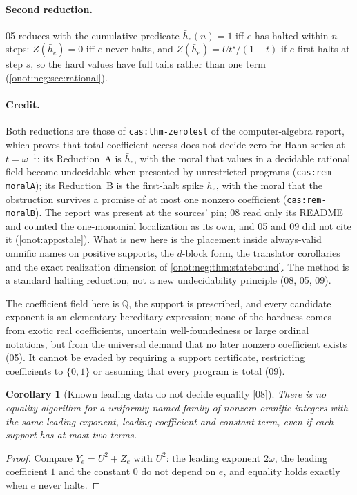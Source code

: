 \documentclass[11pt,oneside]{article}
\numberwithin{equation}{section}
\newtheorem{corollary}[corollary]{Corollary}
\theoremstyle{definition}
\theoremstyle{remark}
\newcommand{\Q}{\mathbb Q}
\newcommand{\hb}{\bar h}
\newcommand{\src}[1]{\textup{\textsf{\small[#1]}}}
\newcommand{\replabel}[1]{\nolinkurl{#1}}
\begin{document}
\paragraph{Second reduction.} 05 reduces with the cumulative predicate
$\hb_e(n)=1$ iff $e$ has halted within $n$ steps: $Z(\hb_e)=0$ iff $e$ never
halts, and $Z(\hb_e)=U t^s/(1-t)$ if $e$ first halts at step $s$, so the hard
values have full tails rather than one term (\cref{onot:neg:sec:rational}).

\paragraph{Credit.} Both reductions are those of \replabel{cas:thm-zerotest} of
the computer-algebra report, which proves that total coefficient access does not
decide zero for Hahn series at $t=\omega^{-1}$: its Reduction~A is $\hb_e$, with
the moral that values in a decidable rational field become undecidable when
presented by unrestricted programs (\replabel{cas:rem-moralA}); its Reduction~B is
the first-halt spike $h_e$, with the moral that the obstruction survives a promise
of at most one nonzero coefficient (\replabel{cas:rem-moralB}). The report was
present at the sources' pin; 08 read only its README and counted the
one-monomial localization as its own, and 05 and 09 did not cite it
(\cref{onot:app:stale}). What is new here is the placement inside always-valid
omnific names on positive supports, the $d$-block form, the translator
corollaries and the exact realization dimension of \cref{onot:neg:thm:statebound}.
The method is a standard halting reduction, not a new undecidability principle
(08, 05, 09).

The coefficient field here is $\Q$, the support is prescribed, and every
candidate exponent is an elementary hereditary expression; none of the hardness
comes from exotic real coefficients, uncertain well-foundedness or large ordinal
notations, but from the universal demand that no later nonzero coefficient
exists (05). It cannot be evaded by requiring a support certificate, restricting
coefficients to $\{0,1\}$ or assuming that every program is total (09).

\begin{corollary}[Known leading data do not decide equality \src{08}]\label{onot:neg:cor:knownleading}
There is no equality algorithm for a uniformly named family of nonzero omnific
integers with the same leading exponent, leading coefficient and constant term,
even if each support has at most two terms.
\end{corollary}
\begin{proof}
Compare $Y_e=U^2+Z_e$ with $U^2$: the leading exponent $2\omega$, the leading
coefficient $1$ and the constant $0$ do not depend on $e$, and equality holds
exactly when $e$ never halts.
\end{proof}
\end{document}

